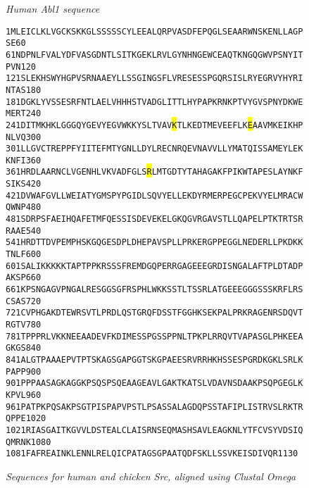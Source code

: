 \documentclass[aps,prl,preprint,nofootinbib,superscriptaddress,linenumbers]{revtex4-1}
\begin{document}
\begin{figure}[tb]

\begin{centering}
\emph{Human Abl1 sequence}

\end{centering}

\begin{alltt}
1     MLEICLKLVG CKSKKGLSSS SSCYLEEALQ RPVASDFEPQ GLSEAARWNS KENLLAGPSE    60
61    NDPNLFVALY DFVASGDNTL SITKGEKLRV LGYNHNGEWC EAQTKNGQGW VPSNYITPVN   120
121   SLEKHSWYHG PVSRNAAEYL LSSGINGSFL VRESESSPGQ RSISLRYEGR VYHYRINTAS   180
181   DGKLYVSSES RFNTLAELVH HHSTVADGLI TTLHYPAPKR NKPTVYGVSP NYDKWEMERT   240
241   D{\color{red}ITMKHKLGG GQYGEVYEGV WKKYSLTVAV {\setlength{\fboxsep}{0pt}\colorbox{yellow}{K}}TLKEDTMEV EEFLK{\setlength{\fboxsep}{0pt}\colorbox{yellow}{E}}AAVM KEIKHPNLVQ}   300
301   {\color{red}LLGVCTREPP FYIITEFMTY GNLLDYLREC NRQEVNAVVL LYMATQISSA MEYLEKKNFI}   360
361   {\color{red}HRDLAARNCL VGENHLVKVA DFGLS{\setlength{\fboxsep}{0pt}\colorbox{yellow}{R}}LMTG DTYTAHAGAK FPIKWTAPES LAYNKFSIKS}   420
421   {\color{red}DVWAFGVLLW EIATYGMSPY PGIDLSQVYE LLEKDYRMER PEGCPEKVYE LMRACWQWNP}   480
481   {\color{red}SDRPSFAEIH QAF}ETMFQES SISDEVEKEL GKQGVRGAVS TLLQAPELPT KTRTSRRAAE   540
541   HRDTTDVPEM PHSKGQGESD PLDHEPAVSP LLPRKERGPP EGGLNEDERL LPKDKKTNLF   600
601   SALIKKKKKT APTPPKRSSS FREMDGQPER RGAGEEEGRD ISNGALAFTP LDTADPAKSP   660
661   KPSNGAGVPN GALRESGGSG FRSPHLWKKS STLTSSRLAT GEEEGGGSSS KRFLRSCSAS   720
721   CVPHGAKDTE WRSVTLPRDL QSTGRQFDSS TFGGHKSEKP ALPRKRAGEN RSDQVTRGTV   780
781   TPPPRLVKKN EEAADEVFKD IMESSPGSSP PNLTPKPLRR QVTVAPASGL PHKEEAGKGS   840
841   ALGTPAAAEP VTPTSKAGSG APGGTSKGPA EESRVRRHKH SSESPGRDKG KLSRLKPAPP   900
901   PPPAASAGKA GGKPSQSPSQ EAAGEAVLGA KTKATSLVDA VNSDAAKPSQ PGEGLKKPVL   960
961   PATPKPQSAK PSGTPISPAP VPSTLPSASS ALAGDQPSST AFIPLISTRV SLRKTRQPPE  1020
1021  RIASGAITKG VVLDSTEALC LAISRNSEQM ASHSAVLEAG KNLYTFCVSY VDSIQQMRNK  1080
1081  FAFREAINKL ENNLRELQIC PATAGSGPAA TQDFSKLLSS VKEISDIVQR             1130
\end{alltt}

\begin{centering}
\emph{Sequences for human and chicken Src, aligned using Clustal Omega}

\end{centering}


\end{figure}
\end{document}
